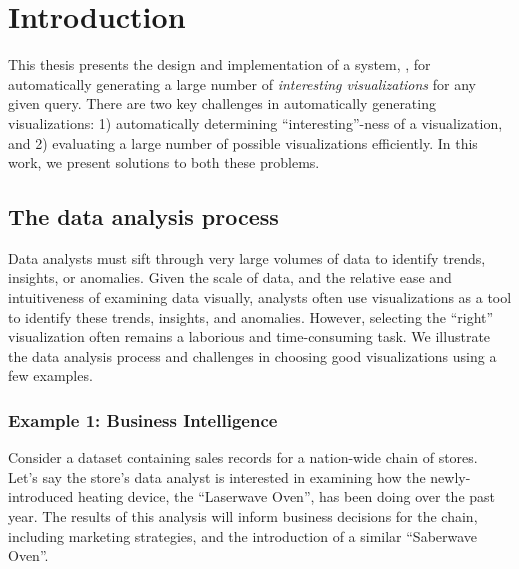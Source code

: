 \chapter{Introduction}
\label{sec:introduction}

This thesis presents the design and implementation of a system, \SeeDB,
for automatically generating a large number of {\it interesting visualizations}
for any given query. There are two key challenges in automatically generating
visualizations: 1) automatically determining ``interesting''-ness of a
visualization, and 2) evaluating a large number of possible visualizations
efficiently.
In this work, we present solutions to both these problems.

\section{The data analysis process}
Data analysts must sift through very large volumes of data 
to identify trends, insights, or anomalies. 
Given the scale of data, and the relative ease and 
intuitiveness of examining data visually,
analysts often use visualizations as a tool to identify
these trends, insights, and anomalies.
However, selecting the ``right'' visualization often 
remains a laborious and time-consuming task. We illustrate the data analysis
process and challenges in choosing good visualizations using a few examples.

\subsection{Example 1: Business Intelligence}
Consider a dataset containing sales records for a nation-wide
chain of stores.
Let's say the store's data analyst is interested
in examining how the newly-introduced heating device, the ``Laserwave
Oven'', has been doing over the past year.
The results of this analysis will inform business decisions
for the chain, including marketing strategies, and the introduction of a similar
``Saberwave Oven''.

